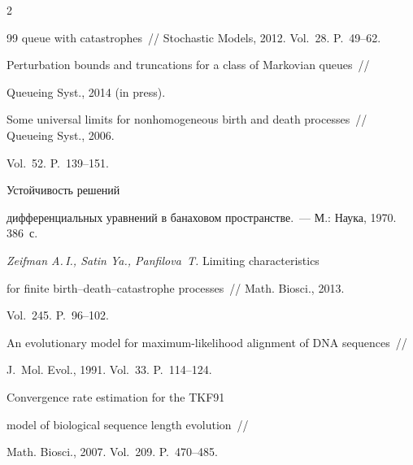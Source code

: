 \begin{multicols}{2}
{{\begin{thebibliography}{99}
queue with catastrophes~// Stochastic Models, 2012. Vol.~28. P.~49--62.





Perturbation bounds and truncations for a class of Markovian queues~//

Queueing Syst.,  2014 (in press).





Some universal limits for nonhomogeneous birth and death processes~// Queueing Syst., 2006.

Vol.~52. P.~139--151.




 Устойчивость решений

диф\-фе\-рен\-циальных уравнений в банаховом пространстве.~--- М.: Наука, 1970. 386~с.




{\it Zeifman A.\,I., Satin Ya., Panfilova~T.} Limiting characteristics

for finite birth--death--catastrophe processes~// Math. Biosci., 2013.

Vol.~245. P.~96--102.





An evolutionary model for maximum-likelihood alignment of DNA sequences~//

J.~Mol. Evol., 1991. Vol.~33. P.~114--124.




  Convergence rate estimation for the TKF91

model of biological sequence length evolution~//

Math. Biosci., 2007. Vol.~209. P.~470--485.






\end{thebibliography}}}
\end{multicols}
